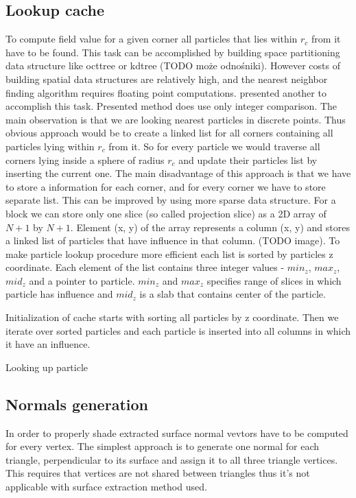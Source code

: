 \subsection{Lookup cache}\label{sec:lookupcache}
To compute field value for a given corner all particles that lies within $r_c$ from it have to be found. This task can be accomplished by building space partitioning data structure like octtree or kdtree (TODO może odnośniki). However costs of building spatial data structures are relatively high, and the nearest neighbor finding algorithm requires floating point computations. \cite{RosenbergBirdwell2008} presented another to accomplish this task. Presented method does use only integer comparison. The main observation is that we are looking nearest particles in discrete points. Thus obvious approach would be to create a linked list for all corners containing all particles lying within $r_c$ from it. So for every particle we would traverse all corners lying inside a sphere of radius $r_c$ and update their particles list by inserting the current one.  The main disadvantage of this approach is that we have to store a information for each corner, and for every corner we have to store separate list. This can be improved by using more sparse data structure. For a block we can store only one slice (so called projection slice) as a 2D array of $N+1$ by $N+1$. Element (x, y) of the array represents a column (x, y) and stores a linked list of particles that have influence in that column. (TODO image). To make particle lookup procedure more efficient each list is sorted by particles z coordinate. Each element of the list contains three integer values - $min_z$, $max_z$, $mid_z$ and a pointer to particle. $min_z$ and $max_z$ specifies range of slices in which particle has influence and $mid_z$ is a slab that contains center of the particle. 

Initialization of cache starts with sorting all particles by z coordinate. Then we iterate over sorted particles and each particle is inserted into all columns in which it have an influence. 

Looking up particle

\subsection{Normals generation}\label{sec:normals}
In order to properly shade extracted surface normal vevtors have to be computed for every vertex. The simplest approach is to generate one normal for each triangle, perpendicular to its surface and assign it to all three triangle vertices. This requires that vertices are not shared between triangles thus it's not applicable with surface extraction method used. 

